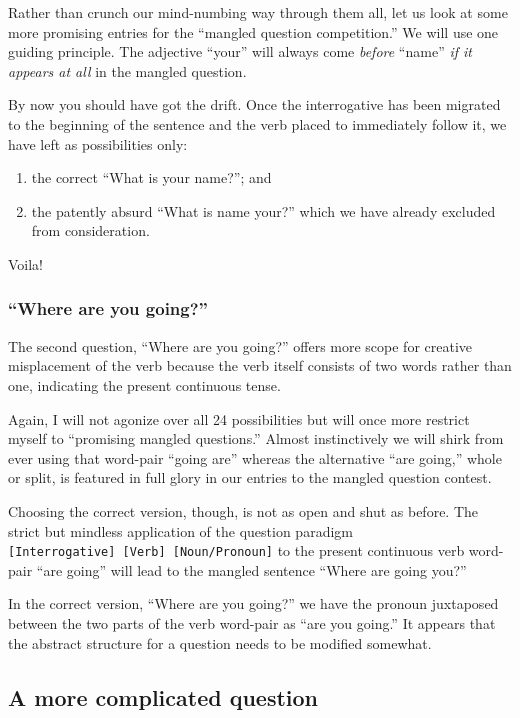 \documentclass[
  12pt,
  a4paper,
]{article}
\providecommand{\tightlist}{%
  \setlength{\itemsep}{0pt}\setlength{\parskip}{0pt}}
\begin{document}
Rather than crunch our mind-numbing way through them all, let us look at
some more promising entries for the ``mangled question competition.'' We
will use one guiding principle. The adjective ``your'' will always come
\emph{before} ``name'' \emph{if it appears at all} in the mangled
question.

By now you should have got the drift. Once the interrogative has been
migrated to the beginning of the sentence and the verb placed to
immediately follow it, we have left as possibilities only:

\begin{enumerate}
\def\labelenumi{\alph{enumi}.}
\tightlist
\item
  the correct ``What is your name?''; and
\item
  the patently absurd ``What is name your?'' which we have already
  excluded from consideration.
\end{enumerate}

Voila!

\hypertarget{where-are-you-going-1}{%
\subsubsection{``Where are you going?''}\label{where-are-you-going-1}}

The second question, ``Where are you going?'' offers more scope for
creative misplacement of the verb because the verb itself consists of
two words rather than one, indicating the present continuous tense.

Again, I will not agonize over all 24 possibilities but will once more
restrict myself to ``promising mangled questions.'' Almost instinctively
we will shirk from ever using that word-pair ``going are'' whereas the
alternative ``are going,'' whole or split, is featured in full glory in
our entries to the mangled question contest.

Choosing the correct version, though, is not as open and shut as before.
The strict but mindless application of the question paradigm
\texttt{{[}Interrogative{]}\ {[}Verb{]}\ {[}Noun/Pronoun{]}} to the
present continuous verb word-pair ``are going'' will lead to the mangled
sentence ``Where are going you?''

In the correct version, ``Where are you going?'' we have the pronoun
juxtaposed between the two parts of the verb word-pair as ``are you
going.'' It appears that the abstract structure for a question needs to
be modified somewhat.

\hypertarget{a-more-complicated-question}{%
\subsection{A more complicated
question}\label{a-more-complicated-question}}
\end{document}
